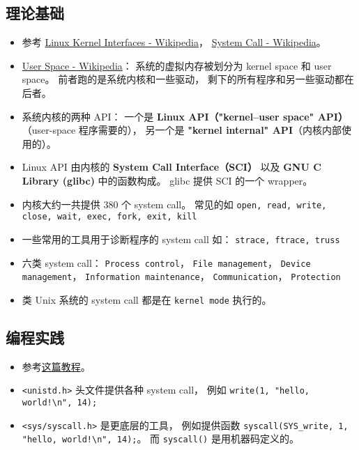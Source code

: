 
\begin{issues}
\issueDraft
\end{issues}

\subsection{理论基础}
\begin{itemize}
\item 参考 \href{https://en.wikipedia.org/wiki/Linux_kernel_interfaces}{Linux Kernel Interfaces - Wikipedia}， \href{https://en.wikipedia.org/wiki/System_call}{System Call - Wikipedia}。
\item \href{https://en.wikipedia.org/wiki/User_space_and_kernel_space}{User Space - Wikipedia}： 系统的虚拟内存被划分为 kernel space 和 user space。 前者跑的是系统内核和一些驱动， 剩下的所有程序和另一些驱动都在后者。
\item 系统内核的两种 API： 一个是 \textbf{Linux API（"kernel–user space" API）}（user-space 程序需要的）， 另一个是 \textbf{"kernel internal" API}（内核内部使用的）。
\item Linux API 由内核的 \textbf{System Call Interface（SCI）} 以及 \textbf{GNU C Library (glibc)} 中的函数构成。 glibc 提供 SCI 的一个 wrapper。
\item 内核大约一共提供 380 个 system call。 常见的如 \verb|open, read, write, close, wait, exec, fork, exit, kill|
\item 一些常用的工具用于诊断程序的 system call 如： \verb|strace, ftrace, truss|
\item 六类 system call： \verb|Process control|， \verb|File management|， \verb|Device management|， \verb|Information maintenance|， \verb|Communication|， \verb|Protection|
\item 类 Unix 系统的 system call 都是在 \verb|kernel mode| 执行的。
\end{itemize}

\subsection{编程实践}
\begin{itemize}
\item 参考\href{https://jameshfisher.com/2018/02/19/how-to-syscall-in-c/}{这篇教程}。
\item \verb|<unistd.h>| 头文件提供各种 system call， 例如 \verb|write(1, "hello, world!\n", 14);|
\item \verb|<sys/syscall.h>| 是更底层的工具， 例如提供函数 \verb|syscall(SYS_write, 1, "hello, world!\n", 14);|。 而 \verb|syscall()| 是用机器码定义的。
\end{itemize}

